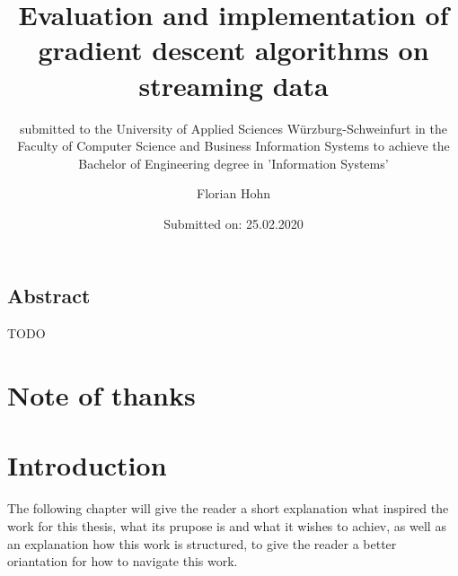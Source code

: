 \documentclass[12pt,oneside,a4paper,parskip]{scrbook}
\def\BaAuthor{Florian Hohn}
\def\BaTitle{Evaluation and implementation of gradient descent algorithms on streaming data}
\def\BaSupervisorOne{Prof.\ Dr.\ Frank-Michael Schleif}
\def\BaSupervisorTwo{Moritz Heusinger}
\def\BaDeadline{25.02.2020}
\begin{document}


\frontmatter
\titlehead{%
  {University of Applied Sciences W\"{u}rzburg-Schweinfurt
  Faculty of Computer Science and Business Information Systems}}
\subject{Bachelor-Thesis}
\title{\BaTitle\\[15mm]}
\subtitle{\normalsize{submitted to the University of Applied Sciences W\"{u}rzburg-Schweinfurt in the Faculty of Computer Science and Business Information Systems to achieve the Bachelor of Engineering degree in 'Information Systems'}}
\author{\BaAuthor}
\date{\normalsize{Submitted on: \BaDeadline}}
\publishers{
  \normalsize{First Reader: \BaSupervisorOne}\\
  \normalsize{Second Reader: \BaSupervisorTwo}\\
}


\maketitle



\section*{Abstract}

TODO

\newpage
\chapter*{Note of thanks}

\tableofcontents	




\mainmatter

\chapter{Introduction}\label{ch:intro}

The following chapter will give the reader a short explanation what inspired the work for this thesis, what its prupose is 
and what it wishes to achiev, as well as an explanation how this work is structured, to give the reader a better oriantation 
for how to navigate this work.
\end{document}
